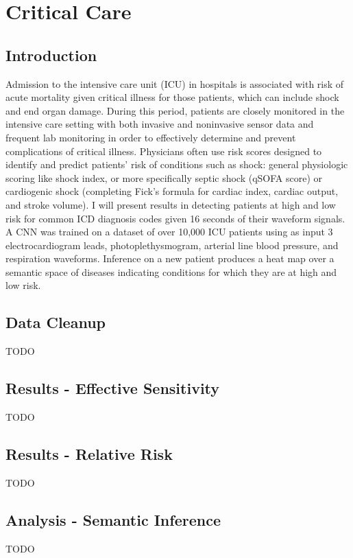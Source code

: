 \chapter{Critical Care}

\section{Introduction}
Admission to the intensive care unit (ICU) in hospitals is associated with risk of acute mortality given critical illness for those patients, which can include shock and end organ damage. During this period, patients are closely monitored in the intensive care setting with both invasive and noninvasive sensor data and frequent lab monitoring in order to effectively determine and prevent complications of critical illness.  Physicians often use risk scores designed to identify and predict patients’ risk of conditions such as shock: general physiologic scoring like shock index, or more specifically septic shock (qSOFA score) or cardiogenic shock (completing Fick’s formula for cardiac index, cardiac output, and stroke volume).  I will present results in detecting patients at high and low risk for common ICD diagnosis codes given 16 seconds of their waveform signals.  A CNN was trained on a dataset of over 10,000 ICU patients using as input 3 electrocardiogram leads, photoplethysmogram, arterial line blood pressure, and respiration waveforms.  Inference on a new patient produces a heat map over a semantic space of diseases indicating conditions for which they are at high and low risk.

\section{Data Cleanup}
TODO

\section{Results - Effective Sensitivity}
TODO

\section{Results - Relative Risk}
TODO

\section{Analysis - Semantic Inference}
TODO